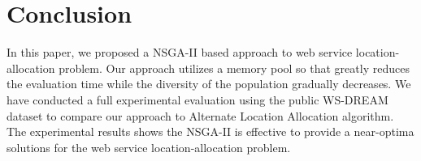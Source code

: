 \documentclass{llncs}
\begin{document}

\section{Conclusion}
In this paper, we proposed a NSGA-II based approach to web service location-allocation problem. 
Our approach utilizes a memory pool so that
greatly reduces the evaluation time while the diversity of the population gradually decreases. We have conducted a full experimental evaluation using the public WS-DREAM dataset to compare our approach to Alternate Location Allocation algorithm. 
The experimental results shows the NSGA-II is effective to provide a near-optima solutions for the web service location-allocation problem.




\end{document}
